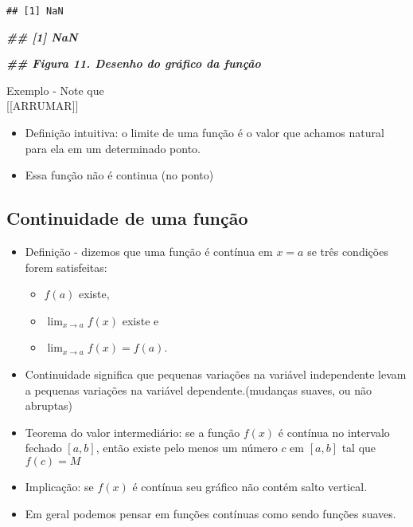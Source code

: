 \documentclass[
]{article}
\newenvironment{Shaded}{\begin{snugshade}}{\end{snugshade}}
\newcommand{\DocumentationTok}[1]{\textcolor[rgb]{0.56,0.35,0.01}{\textbf{\textit{#1}}}}
\providecommand{\tightlist}{%
  \setlength{\itemsep}{0pt}\setlength{\parskip}{0pt}}
\begin{document}
\begin{verbatim}
## [1] NaN
\end{verbatim}

\begin{Shaded}
\begin{Highlighting}[]
\DocumentationTok{\#\# [1] NaN}
\end{Highlighting}
\end{Shaded}

\begin{Shaded}
\begin{Highlighting}[]
\DocumentationTok{\#\# Figura 11. Desenho do gráfico da função}
\end{Highlighting}
\end{Shaded}

Exemplo - Note que \[
\] {[}{[}ARRUMAR{]}{]}

\begin{itemize}
\tightlist
\item
  Definição intuitiva: o limite de uma função é o valor que achamos
  natural para ela em um determinado ponto.
\item
  Essa função não é continua (no ponto)
\end{itemize}

\hypertarget{continuidade-de-uma-funuxe7uxe3o}{%
\subsection{Continuidade de uma
função}\label{continuidade-de-uma-funuxe7uxe3o}}

\begin{itemize}
\tightlist
\item
  Definição - dizemos que uma função é contínua em \(x = a\) se três
  condições forem satisfeitas:

  \begin{itemize}
  \tightlist
  \item
    \(f(a)\) existe,
  \item
    \(\lim_{x \to a} f(x)\) existe e
  \item
    \(\lim_{x \to a} f(x) = f(a)\).
  \end{itemize}
\item
  Continuidade significa que pequenas variações na variável independente
  levam a pequenas variações na variável dependente.(mudanças suaves, ou
  não abruptas)
\item
  Teorema do valor intermediário: se a função \(f(x)\) é contínua no
  intervalo fechado \([a,b]\), então existe pelo menos um número \(c\)
  em \([a,b]\) tal que \(f(c) = M\)
\item
  Implicação: se \(f(x)\) é contínua seu gráfico não contém salto
  vertical.
\item
  Em geral podemos pensar em funções contínuas como sendo funções
  suaves.
\end{itemize}
\end{document}
